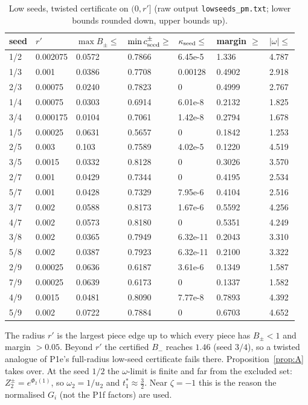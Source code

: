 \documentclass[11pt]{article}
\theoremstyle{definition}\newtheorem{definition}[theorem]{Definition}
\theoremstyle{remark}\newtheorem{remark}[theorem]{Remark}
\begin{document}
\begin{table}[h]\centering\small
\caption{Low seeds, twisted certificate on $(0,r']$ (raw output \texttt{lowseeds\_pm.txt}; lower bounds rounded down, upper bounds up).}\label{tab:L}
\begin{tabular}{lllllll}\toprule
seed & $r'$ & $\max B_\pm\le$ & $\min c^\pm_{\rm seed}\ge$ & $\kappa_{\rm seed}\le$ & margin $\ge$ & $|\omega|\le$\\\midrule
1/2 & 0.002075 & 0.0572 & 0.7866 & 6.45e-5 & 1.336 & 4.787\\
1/3 & 0.001 & 0.0386 & 0.7708 & 0.00128 & 0.4902 & 2.918\\
2/3 & 0.00075 & 0.0240 & 0.7823 & 0 & 0.4999 & 2.767\\
1/4 & 0.00075 & 0.0303 & 0.6914 & 6.01e-8 & 0.2132 & 1.825\\
3/4 & 0.000175 & 0.0104 & 0.7061 & 1.42e-8 & 0.2794 & 1.678\\
1/5 & 0.00025 & 0.0631 & 0.5657 & 0 & 0.1842 & 1.253\\
2/5 & 0.003 & 0.103 & 0.7589 & 4.02e-5 & 0.1220 & 4.519\\
3/5 & 0.0015 & 0.0332 & 0.8128 & 0 & 0.3026 & 3.570\\
2/7 & 0.001 & 0.0429 & 0.7344 & 0 & 0.4195 & 2.534\\
5/7 & 0.001 & 0.0428 & 0.7329 & 7.95e-6 & 0.4104 & 2.516\\
3/7 & 0.002 & 0.0588 & 0.8173 & 1.67e-6 & 0.5592 & 4.256\\
4/7 & 0.002 & 0.0573 & 0.8180 & 0 & 0.5351 & 4.249\\
3/8 & 0.002 & 0.0365 & 0.7949 & 6.32e-11 & 0.2043 & 3.310\\
5/8 & 0.002 & 0.0387 & 0.7923 & 6.32e-11 & 0.2100 & 3.322\\
2/9 & 0.00025 & 0.0636 & 0.6187 & 3.61e-6 & 0.1349 & 1.587\\
7/9 & 0.00025 & 0.0639 & 0.6173 & 0 & 0.1337 & 1.582\\
4/9 & 0.0015 & 0.0481 & 0.8090 & 7.77e-8 & 0.7893 & 4.392\\
5/9 & 0.002 & 0.0722 & 0.7884 & 0 & 0.6703 & 4.652\\\bottomrule
\end{tabular}\end{table}
The radius $r'$ is the largest piece edge up to which every piece has $B_\pm<1$ and margin $>0.05$. Beyond $r'$ the certified $B_-$ reaches $1.46$ (seed $3/4$), so a twisted analogue of P1e's full-radius low-seed certificate fails there. Proposition~\ref{prop:A} takes over.
At the seed $1/2$ the $\omega$-limit is finite and far from the excluded set: $Z^\pm_2=e^{\Phi_2(1)}$, so $\omega_2=1/u_2$ and $t^*_1\approx\frac32$. Near $\zeta=-1$ this is the reason the normalised $G_i$ (not the P1f factors) are used.
\end{document}
